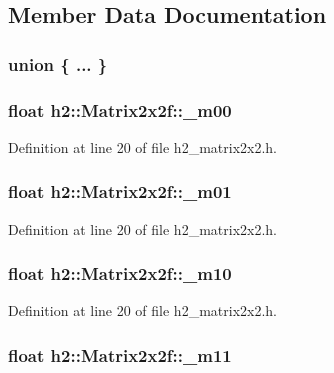\subsection{Member Data Documentation}
\hypertarget{classh2_1_1_matrix2x2f_a9f1ea6032d1d5d402929b11e16184096}{\subsubsection[{"@1}]{\setlength{\rightskip}{0pt plus 5cm}union \{ ... \} }}\label{classh2_1_1_matrix2x2f_a9f1ea6032d1d5d402929b11e16184096}
\hypertarget{classh2_1_1_matrix2x2f_a9e1275895d14f8bd6bc8feeeeeaa7929}{
\subsubsection[{\-\_\-m00}]{\setlength{\rightskip}{0pt plus 5cm}float h2\-::\-Matrix2x2f\-::\-\_\-m00}}\label{classh2_1_1_matrix2x2f_a9e1275895d14f8bd6bc8feeeeeaa7929}


Definition at line 20 of file h2\-\_\-matrix2x2.\-h.

\hypertarget{classh2_1_1_matrix2x2f_a7d73c1fae5e8461bb82e5242fbdd5c1e}{
\subsubsection[{\-\_\-m01}]{\setlength{\rightskip}{0pt plus 5cm}float h2\-::\-Matrix2x2f\-::\-\_\-m01}}\label{classh2_1_1_matrix2x2f_a7d73c1fae5e8461bb82e5242fbdd5c1e}


Definition at line 20 of file h2\-\_\-matrix2x2.\-h.

\hypertarget{classh2_1_1_matrix2x2f_adceb38a04bd7cf0a8ab950c51e60c379}{
\subsubsection[{\-\_\-m10}]{\setlength{\rightskip}{0pt plus 5cm}float h2\-::\-Matrix2x2f\-::\-\_\-m10}}\label{classh2_1_1_matrix2x2f_adceb38a04bd7cf0a8ab950c51e60c379}


Definition at line 20 of file h2\-\_\-matrix2x2.\-h.

\hypertarget{classh2_1_1_matrix2x2f_a9174df3b53a0bd9387c5d2310ac10162}{
\subsubsection[{\-\_\-m11}]{\setlength{\rightskip}{0pt plus 5cm}float h2\-::\-Matrix2x2f\-::\-\_\-m11}}\label{classh2_1_1_matrix2x2f_a9174df3b53a0bd9387c5d2310ac10162}


